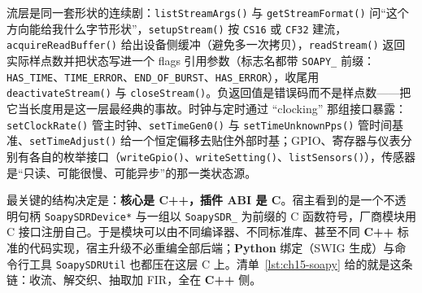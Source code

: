 \documentclass[12pt,a4paper,fontset=fandol]{ctexbook}
\newcommand{\Fn}[1]{\texttt{#1()}}
\newcommand{\Tp}[1]{\texttt{#1}}
\newcommand{\Bk}{\allowbreak}
\newcommand{\Lang}[1]{\textsf{\bfseries #1}}
\newcommand{\CL}{\Lang{C}}
\newcommand{\CPP}{\Lang{C++}}
\newcommand{\PY}{\Lang{Python}}
\begin{document}
流层是同一套形状的连续剧：\Fn{listStreamArgs} 与 \Fn{getStreamFormat} 问``这个方向能给我什么字节形状''，\Fn{setupStream} 按 \Tp{CS16} 或 \Tp{CF32} 建流，\Fn{acquireReadBuffer} 给出设备侧缓冲（避免多一次拷贝），\Fn{readStream} 返回实际样点数并把状态写进一个 flags 引用参数（标志名都带 \Tp{SOAPY\_} \Bk{} 前缀：\Tp{HAS\_TIME}、\Tp{TIME\_ERROR}、\Tp{END\_OF\_BURST}、\Tp{HAS\_ERROR}），收尾用 \Fn{deactivateStream} 与 \Fn{closeStream}。负返回值是错误码而不是样点数——把它当长度用是这一层最经典的事故。时钟与定时通过 ``clocking'' 那组接口暴露：\Fn{setClockRate} 管主时钟、\Fn{setTimeGen0} 与 \Fn{setTimeUnknownPps} 管时间基准、\Fn{setTimeAdjust} 给一个恒定偏移去贴住外部时基；GPIO、寄存器与仪表分别有各自的枚举接口（\Fn{writeGpio}、\Fn{writeSetting}、\Fn{listSensors}），传感器是``只读、可能很慢、可能异步''的那一类状态源。

最关键的结构决定是：\textbf{核心是 \CPP{}，插件 ABI 是 \CL{}}。宿主看到的是一个不透明句柄 \Tp{SoapySDRDevice*} 与一组以 \Tp{SoapySDR\_} \Bk{} 为前缀的 C 函数符号，厂商模块用 C 接口注册自己。于是模块可以由不同编译器、不同标准库、甚至不同 \CPP{} 标准的代码实现，宿主升级不必重编全部后端；\PY{} 绑定（SWIG 生成）与命令行工具 \Tp{SoapySDRUtil} \Bk{} 也都压在这层 C 上。清单~\ref{lst:ch15-soapy} 给的就是这条链：收流、解交织、抽取加 FIR，全在 \CPP{} 侧。
\end{document}
